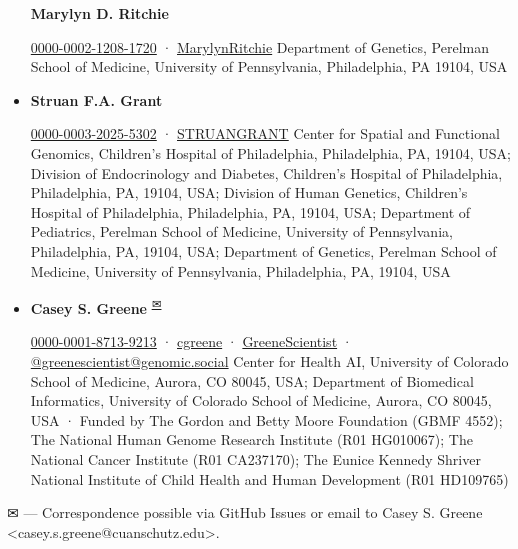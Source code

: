 \documentclass[
        11pt,
]{article}
\begin{document}
\begin{itemize}
  \textbf{Marylyn D. Ritchie}
  
  \href{https://orcid.org/0000-0002-1208-1720}{0000-0002-1208-1720}
  · 
  \href{https://twitter.com/MarylynRitchie}{MarylynRitchie}
  Department of Genetics, Perelman School of Medicine, University of Pennsylvania, Philadelphia, PA 19104, USA
\item
  \textbf{Struan F.A. Grant}
  
  \href{https://orcid.org/0000-0003-2025-5302}{0000-0003-2025-5302}
  · 
  \href{https://twitter.com/STRUANGRANT}{STRUANGRANT}
  Center for Spatial and Functional Genomics, Children's Hospital of Philadelphia, Philadelphia, PA, 19104, USA; Division of Endocrinology and Diabetes, Children's Hospital of Philadelphia, Philadelphia, PA, 19104, USA; Division of Human Genetics, Children's Hospital of Philadelphia, Philadelphia, PA, 19104, USA; Department of Pediatrics, Perelman School of Medicine, University of Pennsylvania, Philadelphia, PA, 19104, USA; Department of Genetics, Perelman School of Medicine, University of Pennsylvania, Philadelphia, PA, 19104, USA
\item
  \textbf{Casey S. Greene}
  \textsuperscript{\protect\hyperlink{correspondence}{✉}}
  
  \href{https://orcid.org/0000-0001-8713-9213}{0000-0001-8713-9213}
  · 
  \href{https://github.com/cgreene}{cgreene}
  · 
  \href{https://twitter.com/GreeneScientist}{GreeneScientist}
  · 
  \href{https://genomic.social/@greenescientist}{@greenescientist@genomic.social}
  Center for Health AI, University of Colorado School of Medicine, Aurora, CO 80045, USA; Department of Biomedical Informatics, University of Colorado School of Medicine, Aurora, CO 80045, USA
  · Funded by The Gordon and Betty Moore Foundation (GBMF 4552); The National Human Genome Research Institute (R01 HG010067); The National Cancer Institute (R01 CA237170); The Eunice Kennedy Shriver National Institute of Child Health and Human Development (R01 HD109765)
\end{itemize}

\leavevmode{}%
✉ --- Correspondence possible via GitHub Issues
or email to
Casey S. Greene \textless casey.s.greene@cuanschutz.edu\textgreater.
\end{document}
